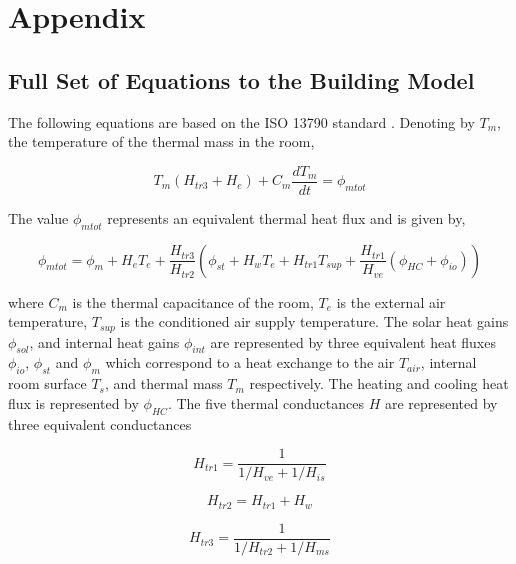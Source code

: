 \chapter{Appendix}
\label{ch:appendix}

\section{Full Set of Equations to the Building Model}

The following equations are based on the ISO 13790 standard \cite{de2008iso}. Denoting by $T_m$, the temperature of the thermal mass in the room,

\begin{equation} 
\label{eq:derrive2}
      T_m(H_{tr3}+H_e) + C_m {\frac{dT_m}{dt}} = \phi_{mtot}
\end{equation}

The value $\phi_{mtot}$ represents an equivalent thermal heat flux and is given by,

\begin{equation} 
\label{eq:heatflow2}
      \phi_{mtot}= \phi_m + H_eT_e + \frac{H_{tr3}}{H_{tr2}}(\phi_{st} + H_wT_e + H_{tr1}T_{sup} + \frac{H_{tr1}}{H_{ve}}(\phi_{HC} + \phi_{io}))
\end{equation}

where $C_m$ is the thermal capacitance of the room, $T_e$ is the external air temperature, $T_{sup}$ is the conditioned air supply temperature. The solar heat gains $\phi_{sol}$, and internal heat gains $\phi_{int}$ are represented by three equivalent heat fluxes $\phi_{io}$, $\phi_{st}$ and $\phi_m$ which correspond to a heat exchange to the air $T_{air}$, internal room surface $T_s$, and thermal mass $T_m$ respectively. The heating and cooling heat flux is represented by $\phi_{HC}$. The five thermal conductances $H$ are represented by three equivalent conductances

\begin{equation} 
\label{eq:Htr12}
      H_{tr1}= \frac{1}{1/H_{ve} + 1/H_{is}}
\end{equation}

\begin{equation} 
\label{eq:Htr2}
      H_{tr2}= H_{tr1} + H_{w}
\end{equation}

\begin{equation} 
\label{eq:Htr32}
      H_{tr3}= \frac{1}{1/H_{tr2} + 1/H_{ms}}
\end{equation}

